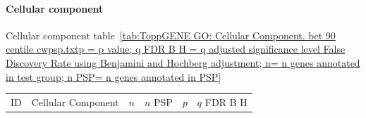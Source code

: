 \paragraph{Cellular component}
Cellular component table~\ref{tab:ToppGENE GO: Cellular Component. bet 90 centile cwpsp.txtp = p value; q FDR B H = q adjusted significance level False Discovery Rate using Benjamini and Hochberg adjustment; n= n genes annotated in test group; n PSP= n genes annotated in PSP}

    \begin{table}[ht]
\centering
\begin{adjustbox}{width=\textwidth}
\setlength{\extrarowheight}{2pt}
\begin{tabular}{@{}clllcl@{}}
  \toprule
  ID & Cellular Component & $n$ & $n$ PSP & $p$ & $q$ FDR B H \\ 


\end{tabular}
\end{adjustbox}
\end{table}
